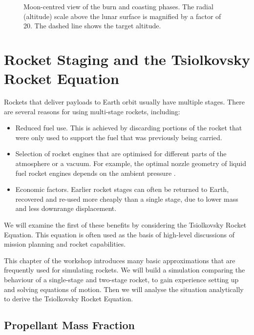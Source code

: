 \documentclass[12pt,openany]{book}
\begin{document}
\begin{figure}[htbp]
  \centering
  \resizebox{0.5\textwidth}{!}{}
  \caption{Moon-centred view of the burn and coasting phases. The radial (altitude) scale above the lunar surface is magnified by a factor of 20. The dashed line shows the target altitude.}
  \label{fig:lunar-ascent-moon-view}
\end{figure}

\chapter{Rocket Staging and the Tsiolkovsky Rocket Equation}

Rockets that deliver payloads to Earth orbit usually have multiple stages. There are several reasons for using multi-stage rockets, including:

\begin{itemize}
\item Reduced fuel use. This is achieved by discarding portions of the rocket that were only used to support the fuel that was previously being carried.
\item Selection of rocket engines that are optimised for different parts of the atmosphere or a vacuum. For example, the optimal nozzle geometry of liquid fuel rocket engines depends on the ambient pressure \cite{marble1964,huzel1967}.
\item Economic factors. Earlier rocket stages can often be returned to Earth, recovered and re-used more cheaply than a single stage, due to lower mass and less downrange displacement.
\end{itemize}

We will examine the first of these benefits by considering the Tsiolkovsky Rocket Equation. This equation is often used as the basis of high-level discussions of mission planning and rocket capabilities.

This chapter of the workshop introduces many basic approximations that are frequently used for simulating rockets. We will build a simulation comparing the behaviour of a single-stage and two-stage rocket, to gain experience setting up and solving equations of motion. Then we will analyse the situation analytically to derive the Tsiolkovsky Rocket Equation.

\section{Propellant Mass Fraction}
\end{document}

